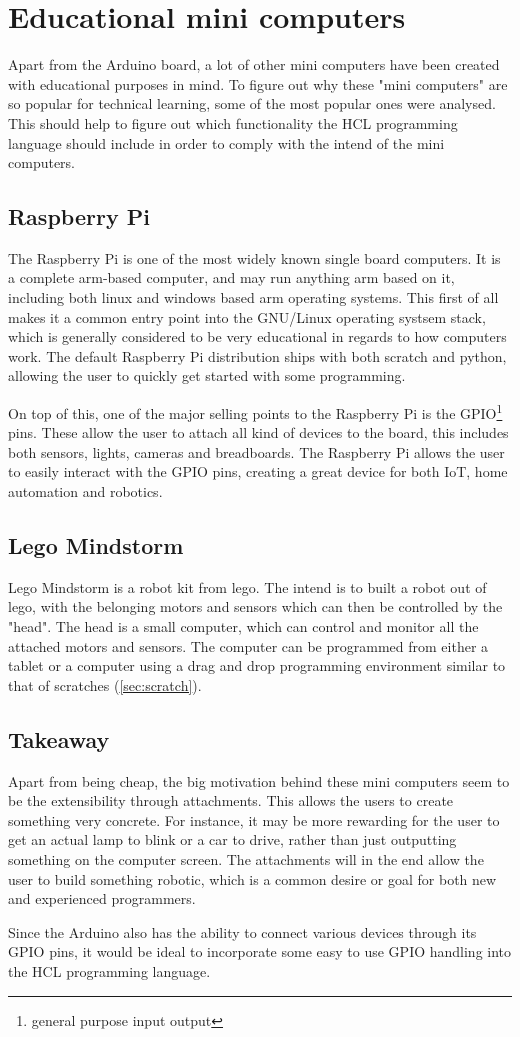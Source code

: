 \section{Educational mini computers}

Apart from the Arduino board, a lot of other mini computers have been created with educational purposes in mind.
To figure out why these "mini computers" are so popular for technical learning, some of the most popular ones were analysed.
This should help to figure out which functionality the HCL programming language should include in order to comply with the intend of the mini computers.

\subsection{Raspberry Pi}
The Raspberry Pi is one of the most widely known single board computers. 
It is a complete arm-based computer, and may run anything arm based on it, including both linux and windows based arm operating systems. 
This first of all makes it a common entry point into the GNU/Linux operating systsem stack, which is generally considered to be very educational in regards to how computers work.
The default Raspberry Pi distribution ships with both scratch and python, allowing the user to quickly get started with some programming.\cite{RaspberryPi}

On top of this, one of the major selling points to the Raspberry Pi is the GPIO\footnote{general purpose input output} pins. 
These allow the user to attach all kind of devices to the board, this includes both sensors, lights, cameras and breadboards. 
The Raspberry Pi allows the user to easily interact with the GPIO pins, creating a great device for both IoT, home automation and robotics.\cite{RaspberryPi}

\subsection{Lego Mindstorm}
Lego Mindstorm is a robot kit from lego. 
The intend is to built a robot out of lego, with the belonging motors and sensors which can then be controlled by the "head". 
The head is a small computer, which can control and monitor all the attached motors and sensors. 
The computer can be programmed from either a tablet or a computer using a drag and drop programming environment similar to that of scratches (\ref{sec:scratch}). \cite{LegoMindstorms}

\subsection{Takeaway}
Apart from being cheap, the big motivation behind these mini computers seem to be the extensibility through attachments. This allows the users to create something very concrete. For instance, it may be more rewarding for the user to get an actual lamp to blink or a car to drive, rather than just outputting something on the computer screen. The attachments will in the end allow the user to build something robotic, which is a common desire or goal for both new and experienced programmers.\cite{EducationalRobotics}

Since the Arduino also has the ability to connect various devices through its GPIO pins, it would be ideal to incorporate some easy to use GPIO handling into the HCL programming language.
